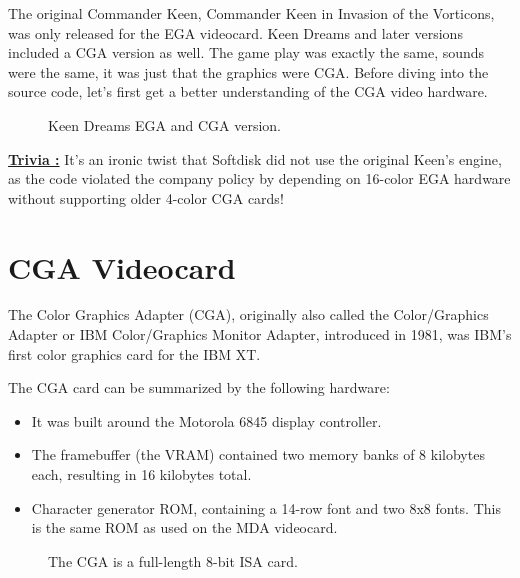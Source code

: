 \documentclass[book.tex]{subfiles}
\begin{document}
The original Commander Keen, Commander Keen in Invasion of the Vorticons, was only released for the EGA videocard. Keen Dreams and later versions included a CGA version as well. The game play was exactly the same, sounds were the same, it was just that the graphics were CGA. Before diving into  the source code, let's first get a better understanding of the CGA video hardware.\\


\begin{figure}[H] 
  \centering 
  \caption{Keen Dreams EGA and CGA version.}
\end{figure}

\par
\textbf{\underline{Trivia :}} It's an ironic twist that Softdisk did not use the original Keen's engine, as the code violated the company policy by depending on 16-color EGA hardware without supporting older 4-color CGA cards!\\
\par


 

\section{CGA Videocard}
The Color Graphics Adapter (CGA), originally also called the Color/Graphics Adapter or IBM Color/Graphics Monitor Adapter, introduced in 1981, was IBM's first color graphics card for the IBM XT.\\
\par
The CGA card can be summarized by the following hardware:
\begin{itemize}
  \item It was built around the Motorola 6845 display controller.
  \item The framebuffer (the VRAM) contained two memory banks of 8 kilobytes each, resulting in 16 kilobytes total.
  \item Character generator ROM, containing a 14-row font and two 8x8 fonts. This is the same ROM as used on the MDA videocard.
\end{itemize}

\begin{figure}[H] 
  \centering 
  \caption{The CGA is a full-length 8-bit ISA card.}
\end{figure}
\end{document}
